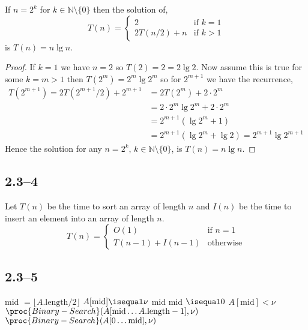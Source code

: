 \begin{proposition}
	\label{prop:power-2-recurrence}
	If $n=2^{k}$ for $k\in\mathbb{N}\setminus\{0\}$ then the solution of,
	\begin{equation*}
		T(n) =
		\begin{cases}
			2 &\text{if }k=1\\
			2T(n/2) + n &\text{if }k>1
		\end{cases}
	\end{equation*}
	is $T(n)=n\lg n$.
\end{proposition}

\begin{proof}
	If $k=1$ we have $n=2$ so $T(2) = 2 = 2\lg 2$. Now assume this is true for some $k=m>1$ then $T(2^{m}) = 2^{m}\lg 2^{m}$ so for $2^{m+1}$ we have the recurrence,
	\begin{equation*}
		\begin{aligned}
			T(2^{m+1}) = 2T(2^{m+1}/2) + 2^{m+1} &= 2T(2^{m}) + 2\cdot2^{m}\\
			&= 2\cdot2^{m}\lg 2^{m} + 2\cdot 2^{m}\\
			&= 2^{m+1}\left(\lg 2^{m} + 1\right)\\
			&= 2^{m+1}\left(\lg 2^{m} + \lg 2\right) = 2^{m+1}\lg 2^{m+1}
		\end{aligned}
	\end{equation*}
	Hence the solution for any $n=2^{k}$, $k\in\mathbb{N}\setminus\{0\}$, is $T(n)=n\lg n$.
\end{proof}

\subsection*{2.3--4}

Let $T(n)$ be the time to sort an array of length $n$ and $I(n)$ be the time to insert an element into an array of length $n$.
\begin{equation*}
	T(n) =
	\begin{cases}
		O(1)& \text{if }n=1\\
		T(n-1) + I(n-1)& \text{otherwise}
	\end{cases}
\end{equation*}

\subsection*{2.3--5}

\begin{codebox}
	\li mid $= \lfloor A.\text{length}/2 \rfloor$
	\li \If $A[\text{mid}] \isequal \nu$
	\li \Then
				\Return mid
			\End
	\li \ElseIf mid $\isequal 0$
	\li	\Then
				\Return {}
			\End
	\li \ElseIf $A[\text{mid}]<\nu$
	\li	\Then
				$\proc{Binary-Search}(A[\text{mid}\ldots A.\text{length}-1], \nu)$
			\End
	\li \Else
	\li	\Then
				$\proc{Binary-Search}(A[0\ldots \text{mid}], \nu)$
			\End
\end{codebox}

